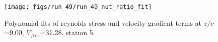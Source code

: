 \begin{figure}[H]
\centering
\texttt{[image: figs/run\_49/run\_49\_nut\_ratio\_fit]}
\caption{Polynomial fits of reynolds stress and velocity gradient terms at $z/c$=9.00, $V_{free}$=31.28, station 5.}
\label{fig:run_49_nut_ratio_fit}
\end{figure}


